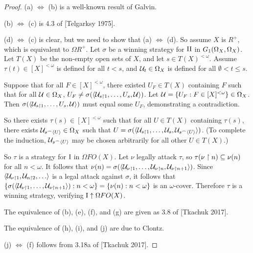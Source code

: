 \documentclass[11pt]{article}
\theoremstyle{plain}
\theoremstyle{definition}
\theoremstyle{remark}
\theoremstyle{plain}
\theoremstyle{definition}
\theoremstyle{remark}
\begin{document}
\begin{proof}
  (a) \(\Leftrightarrow\) (b) is a well-known result of Galvin.

  (b) \(\Leftrightarrow\) (c) is 4.3 of [Telgarksy 1975].
  
  (d) \(\Leftrightarrow\) (c) is clear, but we need to show that (a) \(\Leftrightarrow\) (d).
  So assume \(X\) is \(R^+\), which is equivalent to \(\Omega R^+\). 
  Let \(\sigma\) be a winning strategy for \(\mathrm{II}\) in 
  \(G_{1}(\Omega_X,\Omega_X)\). Let \(T(X)\) be the non-empty
  open sets of \(X\), and let \(s\in T(X)^{<\omega}\).
  Assume \(\tau(t)\in[X]^{<\omega}\) is defined for all \(t<s\),
  and \(\mathcal{U}_t\in\Omega_X\) is defined for all 
  \(\emptyset<t\leq s\). 

  Suppose that for all \(F\in[X]^{<\omega}\), there existed \(U_F\in T(X)\)
  containing \(F\) such that for all \(\mathcal{U}\in\Omega_X\),
  \(U_F\not=\sigma(\langle\mathcal{U}_{s\restriction 1},\dots,U_s,\mathcal{U}\rangle)\).
  Let \(\mathcal{U}=\{U_F:F\in[X]^{<\omega}\}\in\Omega_X\).
  Then \(\sigma(\langle\mathcal{U}_{s\restriction 1},\dots,U_s,\mathcal{U}\rangle)\)
  must equal some \(U_F\), demonstrating a contradiction.

  So there exists \(\tau(s)\in[X]^{<\omega}\) such that for all \(U\in T(X)\)
  containing \(\tau(s)\),
  there exists \(\mathcal{U}_{s{^\frown}\langle U\rangle}\in\Omega_X\) such that
  \(U=\sigma(\langle\mathcal{U}_{s\restriction 1},\dots,\mathcal{U}_s,\mathcal{U}_{s{^\frown}\langle U\rangle}\rangle)\).
  (To complete the induction, \(\mathcal{U}_{s{^\frown}\langle U\rangle}\) may be chosen
  arbitrarily for all other \(U\in T(X)\).)

  So \(\tau\) is a strategy for \(\mathrm{I}\) in \(\Omega FO(X)\).
  Let \(\nu\) legally attack \(\tau\), so
  \(\tau(\nu\restriction n)\subseteq \nu(n)\) for all \(n<\omega\).
  It follows that 
  \(\nu(n)=\sigma(\langle\mathcal{U}_{\nu\restriction 1},\dots,\mathcal{U}_{\nu\restriction n},\mathcal{U}_{\nu\restriction n+1}\rangle)\).
  Since \(\<\mc U_{\nu\rest 1},\mc U_{n\rest 2},\dots\>\) is a legal attack
  against \(\sigma\), it follows that
  \(\{\sigma(\langle\mathcal{U}_{\nu\restriction 1},\dots,\mathcal{U}_{\nu\restriction n+1}\rangle):n<\omega\}=\{\nu(n):n<\omega\}\)
  is an \(\omega\)-cover. Therefore \(\tau\) is a winning strategy, 
  verifying \(\mathrm{I}\uparrow\Omega FO(X)\).

  The equivalence of (b), (e), (f), and (g) are given as 3.8 of [Tkachuk 2017].

  The equivalence of (h), (i), and (j) are due to Clontz.

  (j) \(\Leftrightarrow\) (f) follows from 3.18a of [Tkachuk 2017].
\end{proof}
\end{document}
